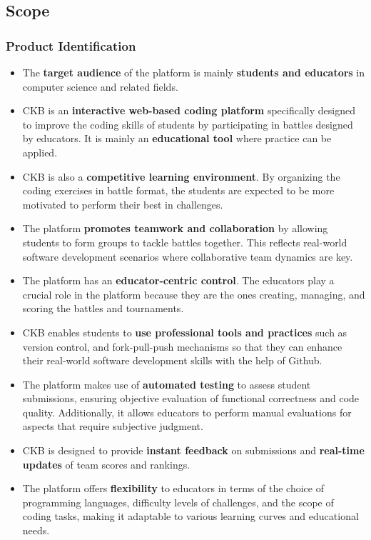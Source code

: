 \subsection{Scope}

\subsubsection{Product Identification}

\begin{itemize}

    \item The \textbf{target audience} of the platform is mainly \textbf{students and educators} in computer science and related fields. 
    
    \item CKB is an \textbf{interactive web-based coding platform} specifically designed to improve the coding skills of students by participating in battles designed by educators. It is mainly an \textbf{educational tool} where practice can be applied.

    \item CKB is also a \textbf{competitive learning environment}. By organizing the coding exercises in battle format, the students are expected to be more motivated to perform their best in challenges.

    \item The platform \textbf{promotes teamwork and collaboration} by allowing students to form groups to tackle battles together. This reflects real-world software development scenarios where collaborative team dynamics are key.

    \item The platform has an \textbf{educator-centric control}. The educators play a crucial role in the platform because they are the ones creating, managing, and scoring the battles and tournaments.

    \item CKB enables students to \textbf{use professional tools and practices} such as version control, and fork-pull-push mechanisms so that they can enhance their real-world software development skills with the help of Github.

    \item The platform makes use of \textbf{automated testing} to assess student submissions, ensuring objective evaluation of functional correctness and code quality. Additionally, it allows educators to perform manual evaluations for aspects that require subjective judgment.

    \item CKB is designed to provide \textbf{instant feedback} on submissions and \textbf{real-time updates} of team scores and rankings.

    \item The platform offers \textbf{flexibility} to educators in terms of the choice of programming languages, difficulty levels of challenges, and the scope of coding tasks, making it adaptable to various learning curves and educational needs.

    
\end{itemize}

